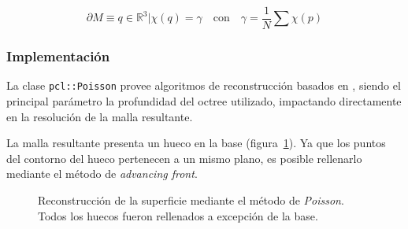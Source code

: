 		\[\partial M \equiv {q \in \mathbb{R}^3 | \chi(q) = \gamma} \quad \mbox{con}
			\quad \gamma = \frac{1}{N} \sum \chi(p) \]




	\subsubsection{Implementación}
	La clase \texttt{pcl::Poisson} provee algoritmos de reconstrucción basados en \cite{Kazhdan:2006:PSR:1281957.1281965}, %
	siendo el principal parámetro la profundidad del octree utilizado,
	impactando directamente en la resolución de la malla resultante.




	La malla resultante presenta un hueco en la base (figura~\ref{fig:fill_poisson}).
	Ya que los puntos del contorno del hueco pertenecen a un mismo plano, es posible rellenarlo mediante el método de \emph{advancing front}.

	\begin{figure}
		\caption{\label{fig:fill_poisson}Reconstrucción de la superficie mediante el método de \emph{Poisson}. Todos los huecos fueron rellenados a excepción de la base.}
	\end{figure}

